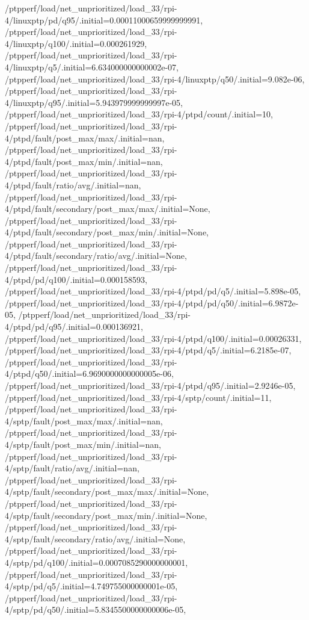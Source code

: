 {    /ptpperf/load/net_unprioritized/load_33/rpi-4/linuxptp/pd/q95/.initial=0.00011000659999999991,
    /ptpperf/load/net_unprioritized/load_33/rpi-4/linuxptp/q100/.initial=0.000261929,
    /ptpperf/load/net_unprioritized/load_33/rpi-4/linuxptp/q5/.initial=6.634000000000002e-07,
    /ptpperf/load/net_unprioritized/load_33/rpi-4/linuxptp/q50/.initial=9.082e-06,
    /ptpperf/load/net_unprioritized/load_33/rpi-4/linuxptp/q95/.initial=5.943979999999997e-05,
    /ptpperf/load/net_unprioritized/load_33/rpi-4/ptpd/count/.initial=10,
    /ptpperf/load/net_unprioritized/load_33/rpi-4/ptpd/fault/post_max/max/.initial=nan,
    /ptpperf/load/net_unprioritized/load_33/rpi-4/ptpd/fault/post_max/min/.initial=nan,
    /ptpperf/load/net_unprioritized/load_33/rpi-4/ptpd/fault/ratio/avg/.initial=nan,
    /ptpperf/load/net_unprioritized/load_33/rpi-4/ptpd/fault/secondary/post_max/max/.initial=None,
    /ptpperf/load/net_unprioritized/load_33/rpi-4/ptpd/fault/secondary/post_max/min/.initial=None,
    /ptpperf/load/net_unprioritized/load_33/rpi-4/ptpd/fault/secondary/ratio/avg/.initial=None,
    /ptpperf/load/net_unprioritized/load_33/rpi-4/ptpd/pd/q100/.initial=0.000158593,
    /ptpperf/load/net_unprioritized/load_33/rpi-4/ptpd/pd/q5/.initial=5.898e-05,
    /ptpperf/load/net_unprioritized/load_33/rpi-4/ptpd/pd/q50/.initial=6.9872e-05,
    /ptpperf/load/net_unprioritized/load_33/rpi-4/ptpd/pd/q95/.initial=0.000136921,
    /ptpperf/load/net_unprioritized/load_33/rpi-4/ptpd/q100/.initial=0.00026331,
    /ptpperf/load/net_unprioritized/load_33/rpi-4/ptpd/q5/.initial=6.2185e-07,
    /ptpperf/load/net_unprioritized/load_33/rpi-4/ptpd/q50/.initial=6.9690000000000005e-06,
    /ptpperf/load/net_unprioritized/load_33/rpi-4/ptpd/q95/.initial=2.9246e-05,
    /ptpperf/load/net_unprioritized/load_33/rpi-4/sptp/count/.initial=11,
    /ptpperf/load/net_unprioritized/load_33/rpi-4/sptp/fault/post_max/max/.initial=nan,
    /ptpperf/load/net_unprioritized/load_33/rpi-4/sptp/fault/post_max/min/.initial=nan,
    /ptpperf/load/net_unprioritized/load_33/rpi-4/sptp/fault/ratio/avg/.initial=nan,
    /ptpperf/load/net_unprioritized/load_33/rpi-4/sptp/fault/secondary/post_max/max/.initial=None,
    /ptpperf/load/net_unprioritized/load_33/rpi-4/sptp/fault/secondary/post_max/min/.initial=None,
    /ptpperf/load/net_unprioritized/load_33/rpi-4/sptp/fault/secondary/ratio/avg/.initial=None,
    /ptpperf/load/net_unprioritized/load_33/rpi-4/sptp/pd/q100/.initial=0.0007085290000000001,
    /ptpperf/load/net_unprioritized/load_33/rpi-4/sptp/pd/q5/.initial=4.749755000000001e-05,
    /ptpperf/load/net_unprioritized/load_33/rpi-4/sptp/pd/q50/.initial=5.8345500000000006e-05,
}
